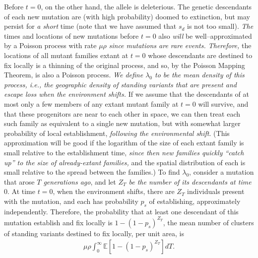 \documentclass{article}
\newcommand{\gc}[1]{{\it\color{blue}#1}}
\newcommand{\mfp}[1]{{\it\color{red}#1}}
\newcommand{\plr}[1]{{\it\color{Fuchsia}#1}}
\newcommand{\E}{\mathbb{E}}
\begin{document}
Before $t=0$, on the other hand, the allele is deleterious.
The genetic descendants of each new mutation are (with high probability) doomed to extinction,
but may persist for \mfp{a short} time (note that we have assumed that $s_d$ is not too small).
\gc{The} times and locations of new mutations before $t=0$ also \gc{will} be 
well--approximated by a 
Poisson process with rate $\mu \rho$ %
\gc{since mutations are rare events. Therefore,} 
the locations of all mutant families extant at $t=0$ whose descendants are destined to fix locally is 
a thinning of the original process, 
and so, by the Poisson Mapping Theorem, is also a Poisson process.
\mfp{We define $\lambda_0$ to be the mean density of this process, 
i.e., the geographic density
of standing variants that are present and escape loss when the
environment shifts.}
If we assume that the descendants of at most only a few members of any extant mutant family at $t=0$ will survive,
and that these progenitors are near to each other in space, 
we can then treat each such family as equivalent to a single new mutation,
but with somewhat larger probability of local establishment,
\gc{following the environmental shift}.
(This approximation will be good 
if the logarithm of the size of each extant family is small relative to the establishment time,
\plr{since then new families quickly ``catch up'' to the size of already-extant families,}
and the spatial distribution of each is small relative to the spread between the families.)
To find $\lambda_0$, consider a mutation that arose \plr{$T$ generations ago}, 
and let \gc{$Z_T$ be the number of its descendants at time $0$}.
At time $t=0$, when the environment shifts, there are $Z_T$ individuals present with the mutation,
and each has probability $p_s$ of establishing, approximately independently.
Therefore, the probability that at least one descendant of this mutation establish and fix locally is $1-(1-p_s)^{Z_T}$,
the mean number of clusters of standing variants destined to fix locally, per unit area, is
\begin{align*}
    \mu \rho \int_0^\infty \E\left[1- (1-p_s)^{Z_T}\right] dT .
\end{align*}
\end{document}
